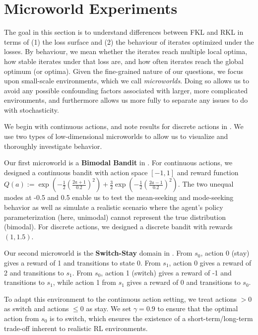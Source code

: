 \documentclass[\main/thesis.tex]{subfiles}
\begin{document}
\chapter{Microworld Experiments}

The goal in this section is to understand differences between FKL and RKL in terms of (1) the loss surface and (2) the behaviour of iterates optimized under the losses. By behaviour, we mean whether the iterates reach multiple local optima, how stable iterates under that loss are, and how often iterates reach the global optimum (or optima). Given the fine-grained nature of our questions, we focus upon small-scale environments, which we call \textit{microworlds}. Doing so allows us to avoid any possible confounding factors associated with larger, more complicated environments, and furthermore allows us more fully to separate any issues to do with stochasticity. 

We begin with continuous actions, and note results for discrete actions in . We use two types of low-dimensional microworlds to allow us to visualize and thoroughly investigate behavior.

Our first microworld is a \textbf{Bimodal Bandit} in . For continuous actions, we designed a continuous bandit with action space $[-1, 1]$ and reward function $Q(a) := \exp( -\tfrac{1}{2} (\tfrac{2 a + 1}{0.2})^2 ) + \tfrac{3}{2} \exp(-\tfrac{1}{2} (\tfrac{2 a - 1}{0.2})^2)$. The two unequal modes at -0.5 and 0.5 enable us to test the mean-seeking and mode-seeking behavior as well as simulate a realistic scenario where the agent's policy parameterization (here, unimodal) cannot represent the true distribution (bimodal). For discrete actions, we designed a discrete bandit with rewards $(1, 1.5)$. 

Our second microworld is the \textbf{Switch-Stay} domain in . From $s_0$, action $0$ (stay) gives a reward of 1 and transitions to state $0$. From $s_1$, action 0 gives a reward of 2 and transitions to $s_1$. From $s_0$, action 1 (switch) gives a reward of -1 and transitions to $s_1$, while action 1 from $s_1$ gives a reward of 0 and transitions to $s_0$. 

To adapt this environment to the continuous action setting, we treat actions $> 0$ as switch and actions $\leq 0$ as stay.  We set $\gamma = 0.9$ to ensure that the optimal action from $s_0$ is to switch, which ensures the existence of a short-term/long-term trade-off inherent to realistic RL environments. 
\end{document}
